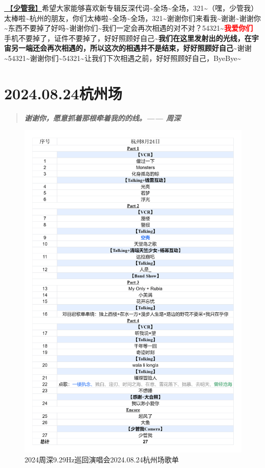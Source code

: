 \documentclass[]{ctexbook}
\begin{document}
\hyperref[watch-ur-manners]{🎵【\textbf{少管我}】}希望大家能够喜欢新专辑反深代词\textasciitilde 全场\textasciitilde 全场，321\textasciitilde（嘿，少管我）太棒啦\textasciitilde 杭州的朋友，你们太棒啦\textasciitilde 全场\textasciitilde 全场，321\textasciitilde 谢谢你们来看我\textasciitilde 谢谢\textasciitilde 谢谢你\textasciitilde 东西不要掉了好吗\textasciitilde 谢谢你们\textasciitilde 我们一定会再次相遇的对不对？54321\textasciitilde{}\textbf{\textcolor{red}{我爱你们~} } 手机不要掉了，证件不要掉了，好好照顾好自己\textasciitilde{}\textbf{我们在这里发射出的光线，在宇宙另一端还会再次相遇的，所以这次的相遇并不是结束，好好照顾好自己\textasciitilde{}}谢谢\textasciitilde54321\textasciitilde 谢谢你们\textasciitilde54321\textasciitilde 让我们下次相遇之前，好好照顾好自己，ByeBye\textasciitilde{}

\chapter{2024.08.24杭州场}\label{hangzhou-20240824}

\begin{quote}
\textbf{\emph{谢谢你，愿意抓着那根牵着我的的线。------ 周深}}
\end{quote}

\begin{figure}

{\centering \includegraphics[width=320pt]{img/playlists/playlists-hangzhou-20240824} 

}

\caption{2024周深9.29Hz巡回演唱会2024.08.24杭州场歌单}\label{fig:unnamed-chunk-78}
\end{figure}
\end{document}
